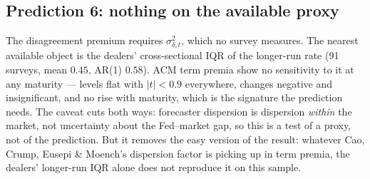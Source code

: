 \documentclass[11pt]{article}
\begin{document}
\subsection{Prediction 6: nothing on the available proxy}
\label{sec:test-prem}
The disagreement premium requires $\sigma^2_{\delta,t}$, which no survey
measures. The nearest available object is the dealers' cross-sectional IQR
of the longer-run rate (91 surveys, mean $0.45$, AR(1) $0.58$). ACM term
premia show no sensitivity to it at any maturity --- levels flat with
$|t|<0.9$ everywhere, changes negative and insignificant, and no rise with
maturity, which is the signature the prediction needs. The caveat cuts both
ways: forecaster dispersion is dispersion \emph{within} the market, not
uncertainty about the Fed--market gap, so this is a test of a proxy, not of
the prediction. But it removes the easy version of the result: whatever Cao,
Crump, Eusepi \& Moench's dispersion factor is picking up in term premia, the
dealers' longer-run IQR alone does not reproduce it on this sample.
\end{document}
